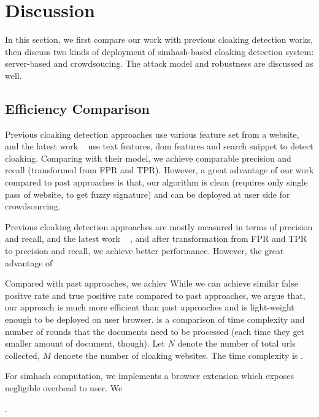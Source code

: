 \section{Discussion}
\label{s:discussion}

In this section, we first compare our work with previous cloaking detection
works, then discuss two kinds of deployment of simhash-based cloaking
detection system: server-based and crowdsoucing. The attack model and robustness
are discussed as well.

\subsection{Efficiency Comparison}
\label{ss:efficiency}
Previous cloaking detection approaches use various feature set from a website,
and the latest work ~\cite{wang2011cloak} use text features, dom features and
search snippet to detect cloaking. Comparing with their model, we achieve
comparable precision and recall (transformed from FPR and TPR). However, a great
advantage of our work compared to past approaches is that, our algorithm is
clean (requires only single pass of website, to get fuzzy signature) and 
can be deployed at user side for crowdsourcing.


Previous cloaking detection approaches are mostly measured in terms of precision
and recall, and the latest work ~\cite{wang2011cloak} , and after transformation from FPR and TPR to precision and recall,
we achieve better performance. However, the great advantage of

Compared with past approaches, we achiev
While we can achieve similar false positve rate and true positive rate compared
to past approaches, we argue that, our approach is much more efficient than past
approaches and is light-weight enough to be deployed on user browser.
 is a comparison of time complexity and number of rounds that the
documents need to be processed (each time they get smaller amount of document,
though). Let $N$ denote the number of total urls collected, $M$ denoete the
number of cloaking websites. The time complexity is .



For simhash computation, we implements a browser extension which exposes
negligible overhead to user. We 

.


